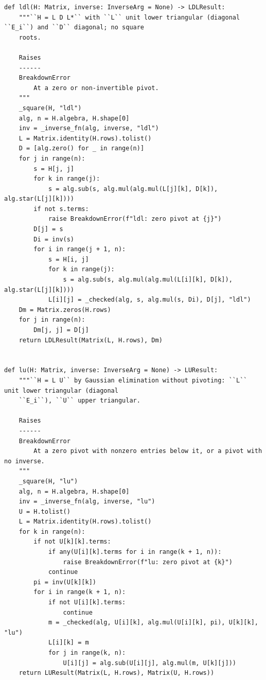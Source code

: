 \documentclass[12pt, a4paper]{report}
\theoremstyle{plain}
\theoremstyle{definition}
\theoremstyle{remark}
\theoremstyle{plain}
\begin{document}
\begin{lstlisting}[style=dsqcode]
def ldl(H: Matrix, inverse: InverseArg = None) -> LDLResult:
    """``H = L D L*`` with ``L`` unit lower triangular (diagonal ``E_i``) and ``D`` diagonal; no square
    roots.

    Raises
    ------
    BreakdownError
        At a zero or non-invertible pivot.
    """
    _square(H, "ldl")
    alg, n = H.algebra, H.shape[0]
    inv = _inverse_fn(alg, inverse, "ldl")
    L = Matrix.identity(H.rows).tolist()
    D = [alg.zero() for _ in range(n)]
    for j in range(n):
        s = H[j, j]
        for k in range(j):
            s = alg.sub(s, alg.mul(alg.mul(L[j][k], D[k]), alg.star(L[j][k])))
        if not s.terms:
            raise BreakdownError(f"ldl: zero pivot at {j}")
        D[j] = s
        Di = inv(s)
        for i in range(j + 1, n):
            s = H[i, j]
            for k in range(j):
                s = alg.sub(s, alg.mul(alg.mul(L[i][k], D[k]), alg.star(L[j][k])))
            L[i][j] = _checked(alg, s, alg.mul(s, Di), D[j], "ldl")
    Dm = Matrix.zeros(H.rows)
    for j in range(n):
        Dm[j, j] = D[j]
    return LDLResult(Matrix(L, H.rows), Dm)


def lu(H: Matrix, inverse: InverseArg = None) -> LUResult:
    """``H = L U`` by Gaussian elimination without pivoting: ``L`` unit lower triangular (diagonal
    ``E_i``), ``U`` upper triangular.

    Raises
    ------
    BreakdownError
        At a zero pivot with nonzero entries below it, or a pivot with no inverse.
    """
    _square(H, "lu")
    alg, n = H.algebra, H.shape[0]
    inv = _inverse_fn(alg, inverse, "lu")
    U = H.tolist()
    L = Matrix.identity(H.rows).tolist()
    for k in range(n):
        if not U[k][k].terms:
            if any(U[i][k].terms for i in range(k + 1, n)):
                raise BreakdownError(f"lu: zero pivot at {k}")
            continue
        pi = inv(U[k][k])
        for i in range(k + 1, n):
            if not U[i][k].terms:
                continue
            m = _checked(alg, U[i][k], alg.mul(U[i][k], pi), U[k][k], "lu")
            L[i][k] = m
            for j in range(k, n):
                U[i][j] = alg.sub(U[i][j], alg.mul(m, U[k][j]))
    return LUResult(Matrix(L, H.rows), Matrix(U, H.rows))
\end{lstlisting}
\end{document}
